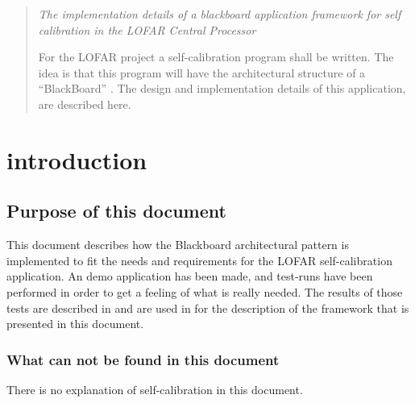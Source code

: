 \documentclass[]{lofar}
\begin{document}
  \maketitle

  \begin{abstract}

    \em{The implementation details of a blackboard application
      framework for self calibration in the LOFAR Central Processor}

    For the LOFAR project a self-calibration program shall be
    written. The idea is that this program will have the architectural
    structure of a ``BlackBoard'' . The design and implementation details
    of this application, are described here.

  \end{abstract}

  \tableofcontents

  \listoffigures


  \section{introduction}
  \label{sec:introduction}\hypertarget{sec:introduction}{}

    \subsection{Purpose of this document}
    \label{subsec:purpose}\hypertarget{subsec:purpose}{}

      This document describes how the Blackboard
       architectural pattern
      is implemented to fit the needs and requirements for the LOFAR
      self-calibration application. An demo application has been made,
      and test-runs have been performed in order to get a feeling of
      what is really needed. The results of those tests are described
      in \cite{bib:LOFAR-ASTRON-MEM-096} and are used in
      for the description of the framework that is presented in this
      document.

      \subsubsection{What can not be found in this document}

        There is no explanation of self-calibration in this document.
\end{document}
